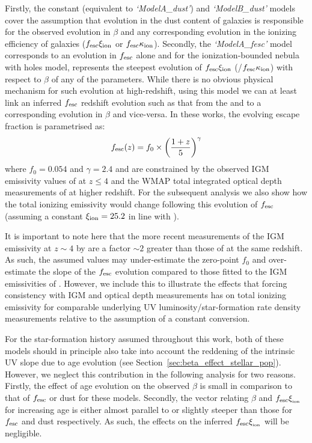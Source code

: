 Firstly, the constant (equivalent to \emph{`ModelA\_dust'}) and \emph{`ModelB\_dust'} models cover the assumption that evolution in the dust content of galaxies is responsible for the observed evolution in $\beta$ and any corresponding evolution in the ionizing efficiency of galaxies ($f_{\rm{esc}}\xi_{\rm{ion}}$ or $f_{\rm{esc}}\kappa_{\rm{ion}}$). Secondly, the \emph{`ModelA\_fesc'} model corresponds to an evolution in $f_{\rm{esc}}$ alone and for the ionization-bounded nebula with holes model, represents the steepest evolution of $f_{\rm{esc}}\xi_{\rm{ion}}$ (/$f_{\rm{esc}}\kappa_{\rm{ion}}$) with respect to $\beta$ of any of the parameters. While there is no obvious physical mechanism for such evolution at high-redshift, using this model we can at least link an inferred $f_{\rm{esc}}$ redshift evolution such as that from the \citet{Kuhlen:2012ka} and \citet{Robertson:2013ji} to a corresponding evolution in $\beta$ and vice-versa. In these works, the evolving escape fraction is parametrised as:
\begin{equation}\label{eq	:fesc_z_r13}
f_{\rm{esc}}(z) = f_{0} \times \left ( \frac{1 + z}{5} \right )^{\gamma }
\end{equation}
where $f_{0} = 0.054$ and $\gamma = 2.4$ \citep{Robertson:2013ji} and are constrained by the observed IGM emissivity values of \citet{FaucherGiguere:2008jc} at $z \leq 4$ and the WMAP total integrated optical depth measurements of \citet{Hinshaw:2013dd} at higher redshift. For the subsequent analysis we also show how the total ionizing emissivity would change following this evolution of $f_{\rm{esc}}$ (assuming a constant $\xi_{\rm{ion}} = 25.2$ in line with \citet{Robertson:2013ji}).

It is important to note here that the more recent measurements of the IGM emissivity at $z\sim4$ by \citet{Becker:2013hc} are a factor $\sim 2$ greater than those of \citet{FaucherGiguere:2008jc} at the same redshift. As such, the assumed values may under-estimate the zero-point $f_{0}$ and over-estimate the slope of the $f_{\rm{esc}}$ evolution compared to those fitted to the IGM emissivities of \citet{Becker:2013hc}. However, we include this to illustrate the effects that forcing consistency with IGM and optical depth measurements has on total ionizing emissivity for comparable underlying UV luminosity/star-formation rate density measurements relative to the assumption of a constant conversion.

 For the star-formation history assumed throughout this work, both of these models should in principle also take into account the reddening of the intrinsic UV slope due to age evolution (see Section~\ref{sec:beta_effect_stellar_pop}). However, we neglect this contribution  in the following analysis for two reasons. Firstly, the effect of age evolution on the observed $\beta$ is small in comparison to that of $f_{\rm{esc}}$ or dust for these models. Secondly, the vector relating $\beta$ and $f_{\rm{esc}}\xi_{\rm_{ion}}$ for increasing age is either almost parallel to or slightly steeper than those for $f_{\rm{esc}}$ and dust respectively. As such, the effects on the inferred $f_{\rm{esc}}\xi_{\rm_{ion}}$ will be negligible.

